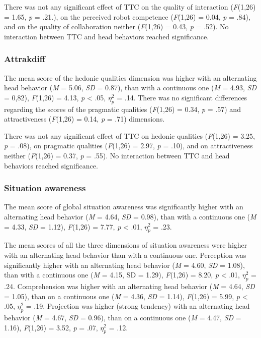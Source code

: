 \documentclass[a4paper,11pt,twoside]{StyleThese}
\begin{document}
There was not any significant effect of TTC on the quality of interaction (\textit{F}(1,26) = 1.65, \textit{p} = .21.), on the perceived robot competence (\textit{F}(1,26) = 0.04, \textit{p} = .84), and on the quality of collaboration neither (\textit{F}(1,26) = 0.43, \textit{p} = .52). No interaction between TTC and head behaviors reached significance.

\subsubsection{Attrakdiff}
The mean score of the hedonic qualities dimension was higher with an alternating head behavior (\textit{M} = 5.06, \textit{SD} = 0.87), than with a continuous one (\textit{M} = 4.93, \textit{SD} = 0,82), \textit{F}(1,26) = 4.13, \textit{p} < .05, $\eta_{p}^{2}$ = .14. There was no significant differences regarding the scores of the pragmatic qualities (\textit{F}(1,26) = 0.34, \textit{p} = .57) and attractiveness (\textit{F}(1,26) = 0.14, \textit{p} = .71) dimensions. 

There was not any significant effect of TTC on hedonic qualities (\textit{F}(1,26) = 3.25, \textit{p} = .08), on pragmatic qualities (\textit{F}(1,26) = 2.97, \textit{p} = .10), and on attractiveness neither (\textit{F}(1,26) = 0.37, \textit{p} = .55). No interaction between TTC and head behaviors reached significance.

\subsubsection{Situation awareness}
The mean score of global situation awareness was significantly higher with an alternating head behavior (\textit{M} = 4.64, \textit{SD} = 0.98), than with a continuous one (\textit{M} = 4.33, \textit{SD} = 1.12), \textit{F}(1,26) = 7.77, \textit{p} < .01, $\eta_{p}^{2}$ = .23.

The mean scores of all the three dimensions of situation awareness were higher with an alternating head behavior than with a continuous one. Perception was significantly higher with an alternating head behavior (\textit{M} = 4.60, \textit{SD} = 1.08), than with a continuous one (\textit{M} = 4.15, SD = 1.29), \textit{F}(1,26) = 8.20, \textit{p} < .01, $\eta_{p}^{2}$ = .24. Comprehension was higher with an alternating head behavior (\textit{M} = 4.64, \textit{SD} = 1.05), than on a continuous one (\textit{M} = 4.36, \textit{SD} = 1.14), \textit{F}(1,26) = 5.99, \textit{p} < .05, $\eta_{p}^{2}$ = .19. Projection was higher (strong tendency) with an alternating head behavior (\textit{M} = 4.67, \textit{SD} = 0.96), than on a continuous one (\textit{M} = 4.47, \textit{SD} = 1.16), \textit{F}(1,26) = 3.52, \textit{p} = .07, $\eta_{p}^{2}$ = .12.
\end{document}
